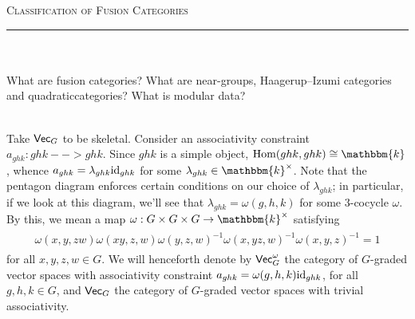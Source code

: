 



\thispagestyle{fancy}

\begin{center}
\LARGE\scshape Classification of Fusion Categories\noindent\\[-\linespacing]
\rule{0.75\linewidth}{1pt}
\end{center}
\noindent\\[-0.75\linespacing]

\noindent\\ What are fusion categories? What are near-groups, Haagerup--Izumi categories and quadratic\linebreak categories? What is modular data?\newpage

\noindent\\ Take $\textup{\textsf{Vec}}_G$ to be skeletal. Consider an associativity constraint $a_{ghk} : ghk --> ghk$. Since $ghk$ is a simple object, $\homset(ghk, ghk) \cong \mathbbm{k}$, whence $a_{ghk} = \lambda_{ghk}\textup{id}_{ghk}$ for some $\lambda_{ghk} \in \mathbbm{k}^\times$. Note that the pentagon diagram enforces certain conditions on our choice of $\lambda_{ghk}$; in particular, if we look at this diagram, we'll see that $\lambda_{ghk} = \omega(g, h, k)$ for some $3$-cocycle $\omega$. By this, we mean a map $\omega : G \times G \times G \to \mathbbm{k}^\times$ satisfying
\begin{align*}
\begin{split}
\omega(x, y, zw)\omega(xy, z, w)\omega(y, z, w)^{-1}\omega(x, yz, w)^{-1}\omega(x, y, z)^{-1} = 1
\end{split}
\end{align*}
for all $x, y, z, w \in G$. We will henceforth denote by $\textup{\textsf{Vec}}_G^\omega$ the category of $G$-graded vector spaces with associativity constraint $a_{ghk} = \omega(g, h, k)\textup{id}_{ghk}$, for all $g, h, k \in G$, and $\textup{\textsf{Vec}}_G$ the category of $G$-graded vector spaces with trivial associativity.\\


